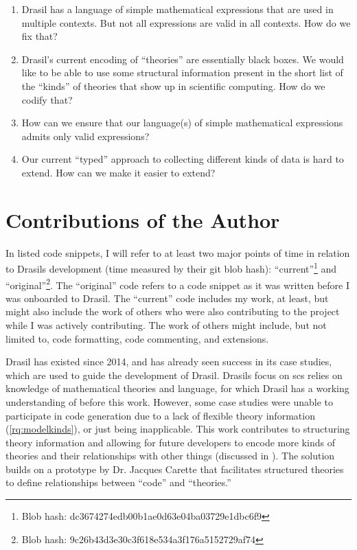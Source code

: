 \begin{enumerate}

      \item[\namedlabel{rq:lang_division}{RQ1}] Drasil has a language of simple
            mathematical expressions that are used in multiple contexts. But not
            all expressions are valid in all contexts. How do we fix that?

      \item[\namedlabel{rq:modelkinds}{RQ2}] Drasil's current encoding of
            ``theories'' are essentially black boxes. We would like to be able
            to use some structural information present in the short list of the
            ``kinds'' of theories that show up in scientific computing. How do
            we codify that?

      \item[\namedlabel{rq:typing}{RQ3}] How can we ensure that our language(s)
            of simple mathematical expressions admits only valid expressions?

      \item[\namedlabel{rq:chunkdb}{RQ4}] Our current ``typed'' approach to
            collecting different kinds of data is hard to extend. How can we
            make it easier to extend?

\end{enumerate}

\section{Contributions of the Author}
\label{sec:intro:contributions}

In listed code snippets, I will refer to at least two major points of time in
relation to Drasils development (time measured by their git blob hash):
``current''\footnote{Blob hash: dc3674274edb00b1ae0d63e04ba03729e1dbc6f9} and
``original''\footnote{Blob hash: 9c26b43d3e30c3f618e534a3f176a5152729af74}. The
``original'' code refers to a code snippet as it was written before I was
onboarded to Drasil. The ``current'' code includes my work, at least, but might
also include the work of others who were also contributing to the project while
I was actively contributing. The work of others might include, but not limited
to, code formatting, code commenting, and extensions.

Drasil has existed since 2014, and has already seen success in its case studies,
which are used to guide the development of Drasil. Drasils focus on \acs{scs}
relies on knowledge of mathematical theories and language, for which Drasil has
a working understanding of before this work. However, some case studies were
unable to participate in code generation due to a lack of flexible theory
information (\ref{rq:modelkinds}), or just being inapplicable. This work
contributes to structuring theory information and allowing for future developers
to encode more kinds of theories and their relationships with other things
(discussed in ). The solution builds on a prototype by Dr.
Jacques Carette that facilitates
structured theories to define relationships between ``code'' and ``theories.''

